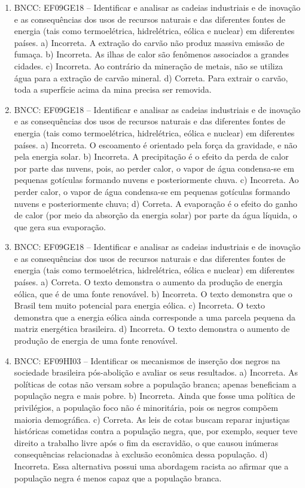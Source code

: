 \begin{enumerate}
\item
BNCC: EF09GE18 -- Identificar e analisar as cadeias industriais e de
inovação e as consequências dos usos de recursos naturais e das diferentes fontes de energia (tais como termoelétrica, hidrelétrica, eólica e nuclear) em diferentes países.
a) Incorreta. A extração do carvão não produz massiva emissão de fumaça.
b) Incorreta. As ilhas de calor são fenômenos associados a grandes
  cidades.
c) Incorreta. Ao contrário da mineração de metais, não se utiliza água
  para a extração de carvão mineral.
d) Correta. Para extrair o carvão, toda a superfície acima da mina precisa
  ser removida.

\item
BNCC: EF09GE18 -- Identificar e analisar as cadeias industriais e de
inovação e as consequências dos usos de recursos naturais e das diferentes fontes de energia (tais como termoelétrica, hidrelétrica, eólica e nuclear) em diferentes países.
a) Incorreta. O escoamento é orientado pela força da gravidade, e não pela
  energia solar.
b) Incorreta. A precipitação é o efeito da perda de calor por parte das
  nuvens, pois, ao perder calor, o vapor de água condensa-se em pequenas
  gotículas formando nuvens e posteriormente chuva.
c) Incorreta. Ao perder calor, o vapor de água condensa-se em pequenas
  gotículas formando nuvens e posteriormente chuva;
d) Correta. A evaporação é o efeito do ganho de calor (por meio da absorção da energia solar) por parte da água
  líquida, o que gera sua evaporação.

\item
BNCC: EF09GE18 -- Identificar e analisar as cadeias industriais e de
inovação e as consequências dos usos de recursos naturais e das
diferentes fontes de energia (tais como termoelétrica, hidrelétrica,
eólica e nuclear) em diferentes países.
a) Correta. O texto demonstra o aumento da produção de energia eólica, que é de uma fonte renovável.
b) Incorreta. O texto demonstra que o Brasil tem muito potencial para energia eólica.
c) Incorreta. O texto demonstra que a energia eólica ainda corresponde a uma parcela pequena da matriz energética brasileira.
d) Incorreta. O texto demonstra o aumento de produção de energia de uma fonte renovável.

\item
BNCC: EF09HI03 -- Identificar os mecanismos de inserção dos
negros na sociedade brasileira pós-abolição e avaliar os seus
resultados. a)  Incorreta. As políticas de cotas não versam sobre a população branca; apenas beneficiam a população negra e mais pobre. b)  Incorreta. Ainda que fosse uma política de privilégios, a população foco não é minoritária, pois os negros compõem maioria demográfica. c)  Correta. As leis de cotas buscam reparar injustiças históricas cometidas contra a população negra, que, por exemplo, sequer teve direito a trabalho livre após o fim da escravidão, o que causou inúmeras consequências relacionadas à exclusão econômica dessa população. d)  Incorreta. Essa alternativa possui uma abordagem racista ao afirmar que a população negra é menos capaz que a população branca.


\end{enumerate}
